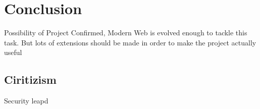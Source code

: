 \chapter{Conclusion}
\label{sec:conclusion}
Possibility of Project Confirmed, Modern Web is evolved enough to tackle this task. But lots of extensions should be made in order to make the project actually useful
\section{Ciritizism}
Security leapd